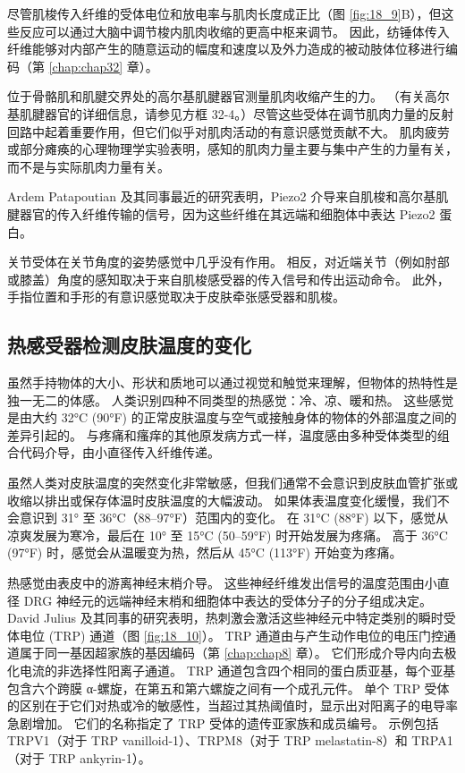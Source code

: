 尽管肌梭传入纤维的受体电位和放电率与肌肉长度成正比（图 \ref{fig:18_9}B），但这些反应可以通过大脑中调节梭内肌肉收缩的更高中枢来调节。 
因此，纺锤体传入纤维能够对内部产生的随意运动的幅度和速度以及外力造成的被动肢体位移进行编码（第 \ref{chap:chap32} 章）。


位于骨骼肌和肌腱交界处的高尔基肌腱器官测量肌肉收缩产生的力。 （有关高尔基肌腱器官的详细信息，请参见方框 32-4。）尽管这些受体在调节肌肉力量的反射回路中起着重要作用，但它们似乎对肌肉活动的有意识感觉贡献不大。 
肌肉疲劳或部分瘫痪的心理物理学实验表明，感知的肌肉力量主要与集中产生的力量有关，而不是与实际肌肉力量有关。


Ardem Patapoutian 及其同事最近的研究表明，Piezo2 介导来自肌梭和高尔基肌腱器官的传入纤维传输的信号，因为这些纤维在其远端和细胞体中表达 Piezo2 蛋白。


关节受体在关节角度的姿势感觉中几乎没有作用。 
相反，对近端关节（例如肘部或膝盖）角度的感知取决于来自肌梭感受器的传入信号和传出运动命令。 
此外，手指位置和手形的有意识感觉取决于皮肤牵张感受器和肌梭。


\subsection{热感受器检测皮肤温度的变化}
虽然手持物体的大小、形状和质地可以通过视觉和触觉来理解，但物体的热特性是独一无二的体感。 
人类识别四种不同类型的热感觉：冷、凉、暖和热。 
这些感觉是由大约 32°C (90°F) 的正常皮肤温度与空气或接触身体的物体的外部温度之间的差异引起的。 
与疼痛和瘙痒的其他原发病方式一样，温度感由多种受体类型的组合代码介导，由小直径传入纤维传递。


虽然人类对皮肤温度的突然变化非常敏感，但我们通常不会意识到皮肤血管扩张或收缩以排出或保存体温时皮肤温度的大幅波动。 
如果体表温度变化缓慢，我们不会意识到 31° 至 36°C（88–97°F）范围内的变化。 
在 31°C (88°F) 以下，感觉从凉爽发展为寒冷，最后在 10° 至 15°C (50–59°F) 时开始发展为疼痛。 
高于 36°C (97°F) 时，感觉会从温暖变为热，然后从 45°C (113°F) 开始变为疼痛。


热感觉由表皮中的游离神经末梢介导。 
这些神经纤维发出信号的温度范围由小直径 DRG 神经元的远端神经末梢和细胞体中表达的受体分子的分子组成决定。 
David Julius 及其同事的研究表明，热刺激会激活这些神经元中特定类别的瞬时受体电位 (TRP) 通道（图 \ref{fig:18_10}）。 
TRP 通道由与产生动作电位的电压门控通道属于同一基因超家族的基因编码（第 \ref{chap:chap8} 章）。 
它们形成介导内向去极化电流的非选择性阳离子通道。 
TRP 通道包含四个相同的蛋白质亚基，每个亚基包含六个跨膜 α-螺旋，在第五和第六螺旋之间有一个成孔元件。 
单个 TRP 受体的区别在于它们对热或冷的敏感性，当超过其热阈值时，显示出对阳离子的电导率急剧增加。 
它们的名称指定了 TRP 受体的遗传亚家族和成员编号。 
示例包括 TRPV1（对于 TRP vanilloid-1）、TRPM8（对于 TRP melastatin-8）和 TRPA1（对于 TRP ankyrin-1）。


